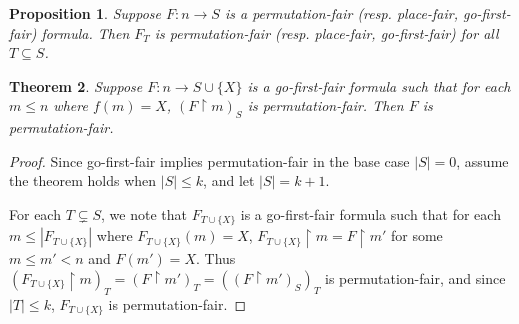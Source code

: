 \documentclass{article}
\newtheorem{theorem}{Theorem}
\newtheorem{proposition}[theorem]{Proposition}
\theoremstyle{definition}
\newcommand{\rest}{\upharpoonright}
\begin{document}
\begin{proposition}
    Suppose \(F:n\to S\) is a permutation-fair (resp. place-fair, go-first-fair)
    formula. Then \(F_T\) is permutation-fair (resp. place-fair, go-first-fair)
    for all \(T\subseteq S\).
\end{proposition}

\begin{theorem}
    Suppose \(F:n\to S\cup\{X\}\) is a go-first-fair formula such that 
    for each \(m\leq n\) where \(f(m)=X\), 
    \((F\rest m)_S\) is permutation-fair.
    Then \(F\) is permutation-fair.
\end{theorem}

\begin{proof}
    Since go-first-fair implies permutation-fair in the base case \(|S|=0\),
    assume the theorem holds when \(|S|\leq k\), and let \(|S|=k+1\).
    
    For each \(T\subsetneq S\), we note that \(F_{T\cup\{X\}}\) is a go-first-fair 
    formula such that for each \(m\leq|F_{T\cup\{X\}}|\) where \(F_{T\cup\{X\}}(m)=X\), 
    \(F_{T\cup\{X\}}\rest m=F\rest m'\) for some \(m\leq m'< n\) and
    \(F(m')=X\). Thus \((F_{T\cup\{X\}}\rest m)_T=(F\rest m')_T=((F\rest m')_S)_T\)
    is permutation-fair, and since \(|T|\leq k\), \(F_{T\cup\{X\}}\) is permutation-fair.


\end{proof}
\end{document}
